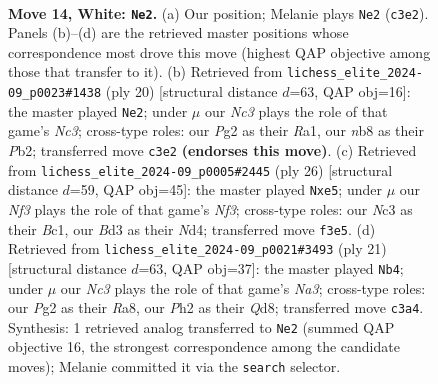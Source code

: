 \documentclass[11pt]{article}
\begin{document}
\clearpage

\begin{figure}[p]\centering
\begin{subfigure}{0.46\textwidth}\centering
\resizebox{\linewidth}{!}{%
\newchessgame
\chessboard[
  setfen={rn3rk1/1p1b1ppp/p1qbpn2/8/8/2NBPN2/PP1B1PPP/R2Q1RK1 w - - 8 14},
  showmover=false,
  pgfstyle=straightmove, color=movearrow, markmove={c3-e2}
]}
\caption{}
\end{subfigure}\hfill
\begin{subfigure}{0.46\textwidth}\centering
\resizebox{\linewidth}{!}{%
\newchessgame
\chessboard[
  setfen={r1bq1rk1/pp2bppp/2n2n2/6B1/3p4/1NNB4/PPP2PPP/R2Q1RK1 w - - 0 11},
  showmover=false,
  pgfstyle=straightmove, color=movearrow, markmove={c3-e2}
]}
\caption{}
\end{subfigure}
\\[4pt]
\begin{subfigure}{0.46\textwidth}\centering
\resizebox{\linewidth}{!}{%
\newchessgame
\chessboard[
  setfen={r1b2rk1/pp2n1pp/2pb1q2/3pn3/3N4/2P2N2/PP2BPPP/R1BQ1RK1 w - - 0 14},
  showmover=false,
  pgfstyle=straightmove, color=movearrow, markmove={f3-e5}
]}
\caption{}
\end{subfigure}\hfill
\begin{subfigure}{0.46\textwidth}\centering
\resizebox{\linewidth}{!}{%
\newchessgame
\chessboard[
  setfen={r2q1rk1/pp1b1pbp/n2p1np1/2pP4/P7/2N2N1P/1PP1BPP1/R1BQ1RK1 b - - 2 11},
  showmover=false,
  pgfstyle=straightmove, color=movearrow, markmove={a6-b4}
]}
\caption{}
\end{subfigure}
\caption{\textbf{Move 14, White: \texttt{Ne2}.} (a) Our position; Melanie plays \texttt{Ne2} (\texttt{c3e2}). Panels (b)--(d) are the retrieved master positions whose correspondence most drove this move (highest QAP objective among those that transfer to it). (b) Retrieved from \texttt{lichess\_elite\_2024-09\_p0023\#1438} (ply 20) [structural distance $d$=63, QAP obj=16]: the master played \texttt{Ne2}; under $\mu$ our \emph{Nc3} plays the role of that game's \emph{Nc3}; cross-type roles: our \emph{P}g2 as their \emph{R}a1, our \emph{n}b8 as their \emph{P}b2; transferred move \texttt{c3e2} \textbf{(endorses this move)}. (c) Retrieved from \texttt{lichess\_elite\_2024-09\_p0005\#2445} (ply 26) [structural distance $d$=59, QAP obj=45]: the master played \texttt{Nxe5}; under $\mu$ our \emph{Nf3} plays the role of that game's \emph{Nf3}; cross-type roles: our \emph{N}c3 as their \emph{B}c1, our \emph{B}d3 as their \emph{N}d4; transferred move \texttt{f3e5}. (d) Retrieved from \texttt{lichess\_elite\_2024-09\_p0021\#3493} (ply 21) [structural distance $d$=63, QAP obj=37]: the master played \texttt{Nb4}; under $\mu$ our \emph{Nc3} plays the role of that game's \emph{Na3}; cross-type roles: our \emph{P}g2 as their \emph{R}a8, our \emph{P}h2 as their \emph{Q}d8; transferred move \texttt{c3a4}. Synthesis: 1 retrieved analog transferred to \texttt{Ne2} (summed QAP objective 16, the strongest correspondence among the candidate moves); Melanie committed it via the \texttt{search} selector.}
\label{fig:thought-m26}
\end{figure}
\end{document}
